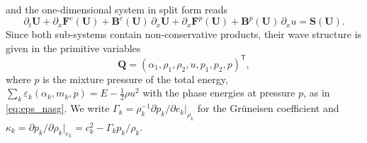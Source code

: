\documentclass[a4paper,fleqn]{cas-sc}
\begin{document}
and the one-dimensional system in split form reads
\begin{equation}
\partial_t\mathbf U+\partial_x\mathbf F^c(\mathbf U)+\mathbf B^c(\mathbf U)\,\partial_x\mathbf U+\partial_x\mathbf F^p(\mathbf U)+\mathbf B^p(\mathbf U)\,\partial_xu=\mathbf S(\mathbf U).
\label{eq:split}
\end{equation}
Since both sub-systems contain non-conservative products, their wave structure is given in the primitive variables
\begin{equation}
\mathbf Q=(\alpha_1,\rho_1,\rho_2,u,p_1,p_2,p)^{\mathsf T},
\label{eq:primitive}
\end{equation}
where $p$ is the mixture pressure of the total energy, $\sum_k\varepsilon_k(\alpha_k,m_k,p)=E-\tfrac12\rho u^2$ with the phase energies at pressure $p$,
as in \eqref{eq:eps_nasg}. We write $\Gamma_k=\rho_k^{-1}\partial p_k/\partial e_k|_{\rho_k}$ for the Gr\"uneisen coefficient and
$\kappa_k=\partial p_k/\partial\rho_k|_{e_k}=c_k^2-\Gamma_kp_k/\rho_k$.
\end{document}
